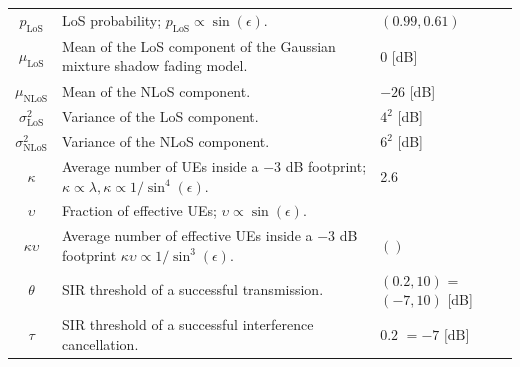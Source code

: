 \documentclass[lettersize,journal]{IEEEtran}
\begin{document}
\begin{table}
\begin{center}
\begin{tabular}{|c|p{4.5cm}|p{1.9cm}|}
      $p_{\text{LoS}}$& LoS probability; $p_{\text{LoS}} \propto \sin(\epsilon)$. & $(0.99,0.61)$\\
      $\mu_{\text{LoS}}$& Mean of the LoS component of the Gaussian mixture shadow fading model. & $0$ [dB] \\
      $\mu_{\text{NLoS}}$& Mean of the NLoS component. & $-26$ [dB] \\
      $\sigma^2_{\text{LoS}}$& Variance of the LoS component. & $4^2$ [dB] \\
      $\sigma^2_{\text{NLoS}}$& Variance of the NLoS component. & $6^2$ [dB] \\
      $\kappa$& Average number of UEs inside a $-3$ dB footprint; $\kappa \propto \lambda, \kappa \propto 1/\sin^4(\epsilon)$.& 2.6 \\
      $\upsilon$&Fraction of effective UEs; $\upsilon \propto \sin(\epsilon)$. & \\      
      $\kappa \upsilon$& Average number of effective UEs inside a $-3$ dB footprint $\kappa \upsilon \propto 1/\sin^3(\epsilon)$.& $()$ \\
      $\theta$ & SIR threshold of a successful transmission.&$(0.2,10)$  \break \hfill =$(-7,10)$ [dB]   \\
      $\tau$ & SIR threshold of a successful interference cancellation.& $0.2$ \hfill \break $=-7\text{ [dB]}$\\  
      \hline
    \end{tabular}
  \end{center}
\end{table}   
\end{document}
